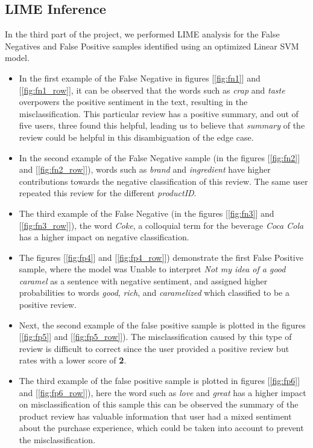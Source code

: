 \documentclass[11pt]{article}
\begin{document}
\subsection{LIME Inference}
In the third part of the project, we performed LIME analysis for the False Negatives and False Positive samples identified using an optimized Linear SVM model.
\begin{itemize}
    \item In the first example of the False Negative in figures [\ref{fig:fn1}] and [\ref{fig:fn1_row}], it can be observed that the words such as \textit{crap} and \textit{taste} overpowers the positive sentiment in the text, resulting in the misclassification. This particular review has a positive summary, and out of five users, three found this helpful, leading us to believe that \textit{summary} of the review could be helpful in this disambiguation of the edge case. 

    \item In the second example of the False Negative sample  (in the figures [\ref{fig:fn2}] and [\ref{fig:fn2_row}]), words such as \textit{brand} and \textit{ingredient} have higher contributions towards the negative classification of this review. The same user repeated this review for the different \textit{productID}. 

    \item The third example of the False Negative (in the figures [\ref{fig:fn3}] and [\ref{fig:fn3_row}]), the word \textit{Coke}, a colloquial term for the beverage \textit{Coca Cola} has a higher impact on negative classification. 


\item The figures [\ref{fig:fp4}] and [\ref{fig:fp4_row}]) demonstrate the first False Positive sample, where the model was
Unable to interpret \textit{Not my idea of a good caramel} as a sentence with negative sentiment, and assigned higher probabilities to words \textit{good}, \textit{rich}, and \textit{caramelized} which classified to be a positive review.


\item Next, the second example of the false positive sample is plotted in the figures [\ref{fig:fp5}] and [\ref{fig:fp5_row}]).  The misclassification caused by this type of review is difficult to correct since the user provided a positive review but rates with a lower score of \textbf{2}. 

\item The third example of the false positive sample is plotted in figures [\ref{fig:fp6}] and [\ref{fig:fp6_row}]), here the word such as \textit{love} and \textit{great} has a higher impact on misclassification of this sample this can be observed the summary of the product review has valuable information that user had a mixed sentiment about the purchase experience, which could be taken into account to prevent the misclassification. 

\end{itemize}
\end{document}

